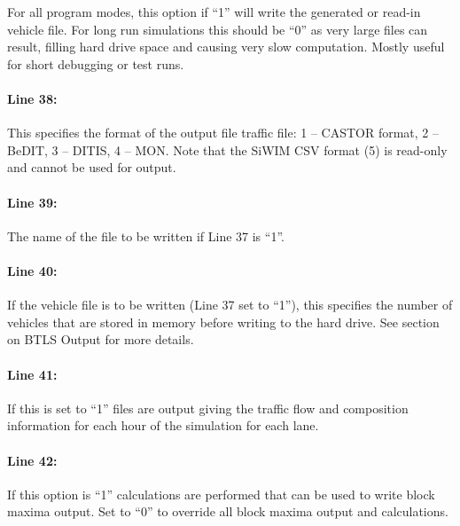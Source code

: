 \documentclass[
]{article}
\begin{document}
For all program modes, this option if ``1'' will write the generated or
read-in vehicle file. For long run simulations this should be ``0'' as
very large files can result, filling hard drive space and causing very
slow computation. Mostly useful for short debugging or test runs.

\paragraph*{Line 38:}\label{line-38}

This specifies the format of the output file traffic file: 1 -- CASTOR
format, 2 -- BeDIT, 3 -- DITIS, 4 -- MON. Note that the SiWIM CSV
format (5) is read-only and cannot be used for output.

\paragraph*{Line 39:}\label{line-39}

The name of the file to be written if Line 37 is ``1''.

\paragraph*{Line 40:}\label{line-40}

If the vehicle file is to be written (Line 37 set to ``1''), this
specifies the number of vehicles that are stored in memory before
writing to the hard drive. See section on BTLS Output for more details.

\paragraph*{Line 41:}\label{line-41}

If this is set to ``1'' files are output giving the traffic flow and
composition information for each hour of the simulation for each lane.

\paragraph*{Line 42:}\label{line-42}

If this option is ``1'' calculations are performed that can be used to
write block maxima output. Set to ``0'' to override all block maxima
output and calculations.
\end{document}
